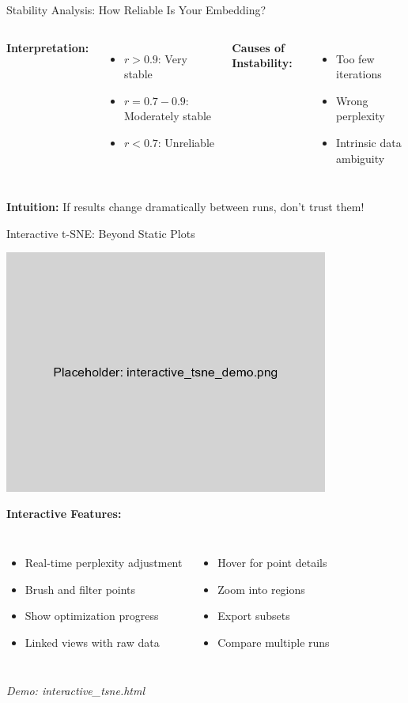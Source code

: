 \documentclass[aspectratio=169]{beamer}
\newcommand{\intuition}[1]{\colorbox{green!10}{\textcolor{intuitioncolor}{\textbf{Intuition:} #1}}}
\begin{document}
\begin{frame}{Stability Analysis: How Reliable Is Your Embedding?}
\begin{columns}
\textbf{Interpretation:}
\begin{itemize}
\item $r > 0.9$: Very stable
\item $r = 0.7-0.9$: Moderately stable
\item $r < 0.7$: Unreliable
\end{itemize}

\textbf{Causes of Instability:}
\begin{itemize}
\item Too few iterations
\item Wrong perplexity
\item Intrinsic data ambiguity
\end{itemize}
\end{columns}

\intuition{If results change dramatically between runs, don't trust them!}
\end{frame}

\begin{frame}{Interactive t-SNE: Beyond Static Plots}
\begin{center}
\includegraphics[width=0.8\textwidth]{./Figures/interactive_tsne_demo.png}
\end{center}

\textbf{Interactive Features:}
\begin{columns}
\begin{itemize}
\item Real-time perplexity adjustment
\item Brush and filter points
\item Show optimization progress
\item Linked views with raw data
\end{itemize}

\begin{itemize}
\item Hover for point details
\item Zoom into regions
\item Export subsets
\item Compare multiple runs
\end{itemize}
\end{columns}

\textit{Demo: interactive\_tsne.html}
\end{frame}
\end{document}
